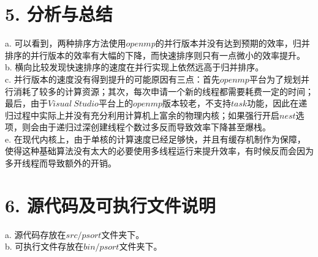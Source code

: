 \documentclass[12pt]{article}
\begin{document}
  \section*{5. 分析与总结}
  a. 可以看到，两种排序方法使用$openmp$的并行版本并没有达到预期的效率，归并排序的并行版本的效率有大幅的下降，而快速排序则只有一点微小的效率提升。\\
  b. 横向比较发现快速排序的速度在并行实现上依然远高于归并排序。\\
  c. 并行版本的速度没有得到提升的可能原因有三点：首先$openmp$平台为了规划并行消耗了较多的计算资源；其次，每次申请一个新的线程都需要耗费一定的时间；最后，由于$Visual \: Studio$平台上的$openmp$版本较老，不支持$task$功能，因此在递归过程中实际上并没有充分利用计算机上富余的物理内核；如果强行开启$nest$选项，则会由于递归过深创建线程个数过多反而导致效率下降甚至爆栈。\\
  e. 在现代内核上，由于单核的计算速度已经足够快，并且有缓存机制作为保障，使得这种基础算法没有太大的必要使用多线程运行来提升效率，有时候反而会因为多开线程而导致额外的开销。
  \section*{6. 源代码及可执行文件说明}
  a. 源代码存放在$src/psort$文件夹下。\\
  b. 可执行文件存放在$bin/psort$文件夹下。\\
\end{document}
